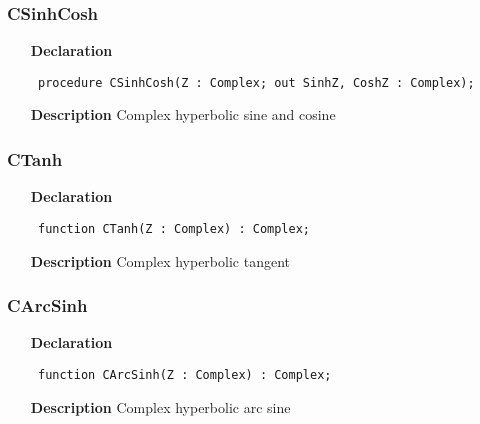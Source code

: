 \documentclass[12pt,a4paper,oneside]{report}
\newcommand{\declarationitem}[1]{\textbf{#1}}
\newcommand{\descriptiontitle}[1]{\textbf{#1}}
\newcommand{\code}[1]{\texttt{#1}}
\begin{document}
\subsubsection{CSinhCosh}
\label{ucomplex-CSinhCosh}
\begin{itemize}\item[\declarationitem{Declaration}\hfill]
\begin{flushleft}
\code{
procedure CSinhCosh(Z : Complex; out SinhZ, CoshZ : Complex);}

\end{flushleft}

\par
\item[\descriptiontitle{Description}]
Complex hyperbolic sine and cosine

\end{itemize}
\subsubsection{CTanh}
\label{ucomplex-CTanh}
\begin{itemize}\item[\declarationitem{Declaration}\hfill]
\begin{flushleft}
\code{
function CTanh(Z : Complex) : Complex;}

\end{flushleft}

\par
\item[\descriptiontitle{Description}]
Complex hyperbolic tangent

\end{itemize}
\subsubsection{CArcSinh}
\label{ucomplex-CArcSinh}
\begin{itemize}\item[\declarationitem{Declaration}\hfill]
\begin{flushleft}
\code{
function CArcSinh(Z : Complex) : Complex;}

\end{flushleft}

\par
\item[\descriptiontitle{Description}]
Complex hyperbolic arc sine

\end{itemize}
\end{document}
